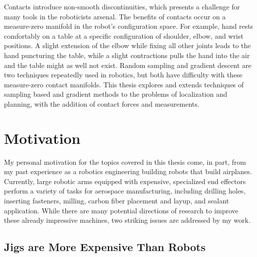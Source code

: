 \documentclass[../thesis.tex]{subfiles}
\begin{document}
Contacts introduce non-smooth discontinuities, which presents a challenge for many tools in the roboticists arsenal.
The benefits of contacts occur on a measure-zero manifold in the robot's configuration space.
For example, hand rests comfortably on a table at a specific configuration of shoulder, elbow, and wrist positions.
A slight extension of the elbow while fixing all other joints leads to the hand puncturing the table, while a slight contractions pulls the hand into the air and the table might as well not exist.
Random sampling and gradient descent are two techniques repeatedly used in robotics, but both have difficulty with these measure-zero contact manifolds.
This thesis explores and extends techniques of sampling based and gradient methods to the problems of localization and planning, with the addition of contact forces and measurements.




\section{Motivation}
My personal motivation for the topics covered in this thesis come, in part, from my past experience as a robotics engineering building robots that build airplanes.
Currently, large robotic arms equipped with expensive, specialized end effectors perform a variety of tasks for aerospace manufacturing, including drilling holes, inserting fasteners, milling, carbon fiber placement and layup, and sealant application.
While there are many potential directions of research to improve these already impressive machines, two striking issues are addressed by my work.

\subsection{Jigs are More Expensive Than Robots}
\end{document}
